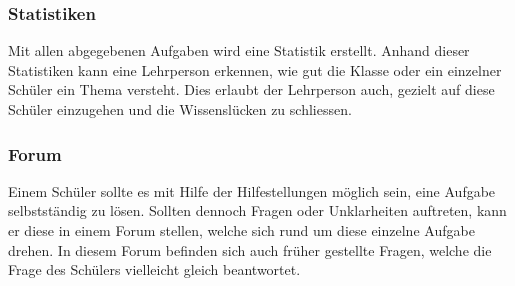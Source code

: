 \subsubsection*{Statistiken}
Mit allen abgegebenen Aufgaben wird eine Statistik erstellt. Anhand dieser Statistiken kann eine Lehrperson erkennen, wie gut die Klasse oder ein einzelner Schüler ein Thema versteht. Dies erlaubt der Lehrperson auch, gezielt auf diese Schüler einzugehen und die Wissenslücken zu schliessen.

\subsubsection*{Forum}
Einem Schüler sollte es mit Hilfe der Hilfestellungen möglich sein, eine Aufgabe selbstständig zu lösen. Sollten dennoch Fragen oder Unklarheiten auftreten, kann er diese in einem Forum stellen, welche sich rund um diese einzelne Aufgabe drehen. In diesem Forum befinden sich auch früher gestellte Fragen, welche die Frage des Schülers vielleicht gleich beantwortet.




\newpage